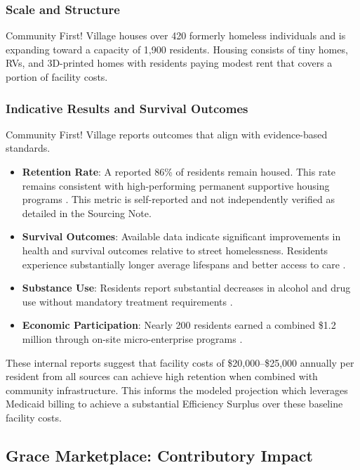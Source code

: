 \documentclass[12pt, letterpaper]{article}
\begin{document}
\subsubsection{Scale and Structure}

Community First! Village houses over 420 formerly homeless individuals and is expanding toward a capacity of 1,900 residents. Housing consists of tiny homes, RVs, and 3D-printed homes with residents paying modest rent that covers a portion of facility costs.

\subsubsection{Indicative Results and Survival Outcomes}

Community First! Village reports outcomes that align with evidence-based standards.

\begin{itemize}
    \item \textbf{Retention Rate}: A reported 86\% of residents remain housed. This rate remains consistent with high-performing permanent supportive housing programs \citep{substack_cfv_2024}. This metric is self-reported and not independently verified as detailed in the Sourcing Note.
    \item \textbf{Survival Outcomes}: Available data indicate significant improvements in health and survival outcomes relative to street homelessness. Residents experience substantially longer average lifespans and better access to care \citep{kvue_2024}.
    \item \textbf{Substance Use}: Residents report substantial decreases in alcohol and drug use without mandatory treatment requirements \citep{kvue_2024}.
    \item \textbf{Economic Participation}: Nearly 200 residents earned a combined \$1.2 million through on-site micro-enterprise programs \citep{dell_foundation_2024}.
\end{itemize}

These internal reports suggest that facility costs of \$20,000--\$25,000 annually per resident from all sources can achieve high retention when combined with community infrastructure. This informs the modeled projection which leverages Medicaid billing to achieve a substantial Efficiency Surplus over these baseline facility costs.

\subsection{Grace Marketplace: Contributory Impact}
\end{document}
